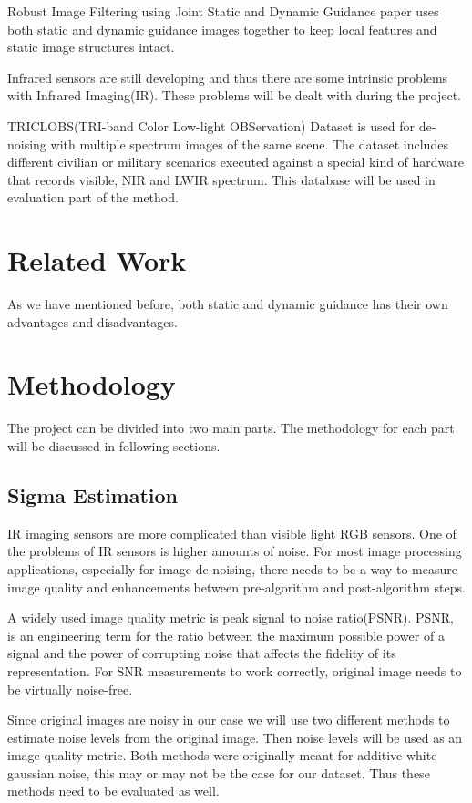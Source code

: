 \documentclass[10pt,twocolumn,letterpaper]{article}
\begin{document}
Robust Image Filtering using Joint Static and Dynamic Guidance\cite{ham2015} paper uses both static and dynamic guidance images together to keep local features and static image structures intact.

Infrared sensors are still developing and thus there are some intrinsic problems with Infrared Imaging(IR). These problems will be dealt with during the project.

TRICLOBS(TRI-band Color Low-light OBServation) Dataset\cite{triclobs} is used for de-noising with multiple spectrum images of the same scene. The dataset includes different civilian or military scenarios executed against a special kind of hardware that records visible, NIR and LWIR spectrum. This database will be used in evaluation part of the method\cite{ham2015}.

\section{Related Work}
As we have mentioned before, both static and dynamic guidance has their own advantages and disadvantages. 
\section{Methodology}
The project can be divided into two main parts. The methodology for each part will be discussed in following sections.

\subsection{Sigma Estimation}
IR imaging sensors are more complicated than visible light RGB sensors. One of the problems of IR sensors is higher amounts of noise.
For most image processing applications, especially for image de-noising, there needs to be a way to measure image quality and enhancements between pre-algorithm and post-algorithm steps.

A widely used image quality metric is peak signal to noise ratio(PSNR). PSNR, is an engineering term for the ratio between the maximum possible power of a signal and the power of corrupting noise that affects the fidelity of its representation\cite{psnr-wiki}. For SNR measurements to work correctly, original image needs to be virtually noise-free.

Since original images are noisy in our case we will use two different methods to estimate noise levels from the original image. Then noise levels will be used as an image quality metric. Both methods were originally meant for additive white gaussian noise, this may or may not be the case for our dataset. Thus these methods need to be evaluated as well.
\end{document}
